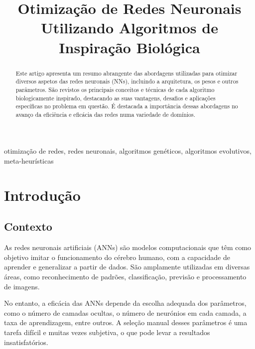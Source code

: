 \documentclass[conference]{IEEEtran}
\begin{document}
    \title{Otimização de Redes Neuronais Utilizando Algoritmos de Inspiração Biológica}

    \author{
    }
    \maketitle

    \begin{abstract}
        Este artigo apresenta um resumo abrangente das abordagens utilizadas para otimizar diversos aspetos das redes neuronais (NNs), incluindo a arquitetura, os pesos e outros parâmetros.
        São revistos os principais conceitos e técnicas de cada algoritmo biologicamente inspirado, destacando as suas vantagens, desafios e aplicações específicas no problema em questão.
        É destacada a importância dessas abordagens no avanço da eficiência e eficácia das redes numa variedade de domínios.
    \end{abstract}

    \begin{IEEEkeywords}
        otimização de redes, redes neuronais, algoritmos genéticos, algoritmos evolutivos, meta-heurísticas
    \end{IEEEkeywords}


    \section{Introdução}\label{sec:intro}

    \subsection{Contexto}\label{subsec:contexto}

    As redes neuronais artificiais (ANNs) são modelos computacionais que têm como objetivo imitar o funcionamento do cérebro humano, com a capacidade de aprender e generalizar a partir de dados.
    São amplamente utilizadas em diversas áreas, como reconhecimento de padrões, classificação, previsão e processamento de imagens.

    No entanto, a eficácia das ANNs depende da escolha adequada dos parâmetros, como o número de camadas ocultas, o número de neurónios em cada camada, a taxa de aprendizagem, entre outros.
    A seleção manual desses parâmetros é uma tarefa difícil e muitas vezes subjetiva, o que pode levar a resultados insatisfatórios.
\end{document}
